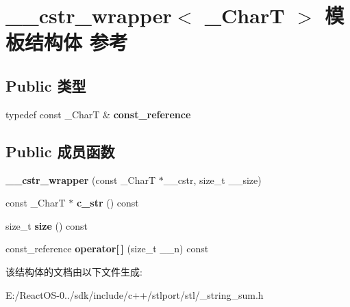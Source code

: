 \hypertarget{struct____cstr__wrapper}{}\section{\+\_\+\+\_\+cstr\+\_\+wrapper$<$ \+\_\+\+CharT $>$ 模板结构体 参考}
\label{struct____cstr__wrapper}
\subsection*{Public 类型}
\begin{DoxyCompactItemize}
\item 
\mbox{\label{struct____cstr__wrapper_ac1e82be41c3709b8a10853430f6875b0}} 
typedef const \+\_\+\+CharT \& {\bfseries const\+\_\+reference}
\end{DoxyCompactItemize}
\subsection*{Public 成员函数}
\begin{DoxyCompactItemize}
\item 
\mbox{\label{struct____cstr__wrapper_a77da3110af377b85523833fa26987ed0}} 
{\bfseries \+\_\+\+\_\+cstr\+\_\+wrapper} (const \+\_\+\+CharT $\ast$\+\_\+\+\_\+cstr, size\+\_\+t \+\_\+\+\_\+size)
\item 
\mbox{\label{struct____cstr__wrapper_a8e611ea94545e4182698cbb03ce0cfe1}} 
const \+\_\+\+CharT $\ast$ {\bfseries c\+\_\+str} () const
\item 
\mbox{\label{struct____cstr__wrapper_af3a43f43587d4260a6cce76e136145f6}} 
size\+\_\+t {\bfseries size} () const
\item 
\mbox{\label{struct____cstr__wrapper_a57b4e78a44196e59a513756de6f68833}} 
const\+\_\+reference {\bfseries operator\mbox{[}$\,$\mbox{]}} (size\+\_\+t \+\_\+\+\_\+n) const
\end{DoxyCompactItemize}


该结构体的文档由以下文件生成\+:\begin{DoxyCompactItemize}
\item 
E\+:/\+React\+O\+S-\/0../sdk/include/c++/stlport/stl/\+\_\+string\+\_\+sum.\+h\end{DoxyCompactItemize}
